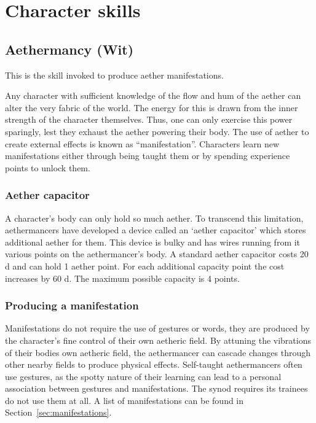 \documentclass[a4paper,11pt,oneside]{book}
\begin{document}
\chapter{Character skills}

\section{Aethermancy (Wit)}
\label{sec:aethermancy}
This is the skill invoked to produce aether manifestations. 

Any character with sufficient knowledge of the flow and hum of the aether can alter the very fabric of the world.  The energy for this is drawn from the inner strength of the character themselves. Thus, one can only exercise this power sparingly, lest they exhaust the aether powering their body. The use of aether to create external effects is known as ``manifestation''. Characters learn new manifestations either through being taught them or by spending experience points to unlock them.

\subsection{Aether capacitor}
\label{sec:capacitor}
A character's body can only hold so much aether. To transcend this limitation, aethermancers have developed a device called an `aether capacitor' which stores additional aether for them. This device is bulky and has wires running from it various points on the aethermancer's body. A standard aether capacitor costs 20 d and can hold 1 aether point. For each additional capacity point the cost increases by 60 d. The maximum possible capacity is 4 points.


\subsection{Producing a manifestation}
Manifestations do not require the use of gestures or words, they are produced by the character's fine control of their own aetheric field. By attuning the vibrations of their bodies own aetheric field, the aethermancer can cascade changes through other nearby fields to produce physical effects. Self-taught aethermancers often use gestures, as the spotty nature of their learning can lead to a personal association between gestures and manifestations. The synod requires its trainees do not use them at all. A list of manifestations can be found in Section~\ref{sec:manifestations}.
\end{document}
